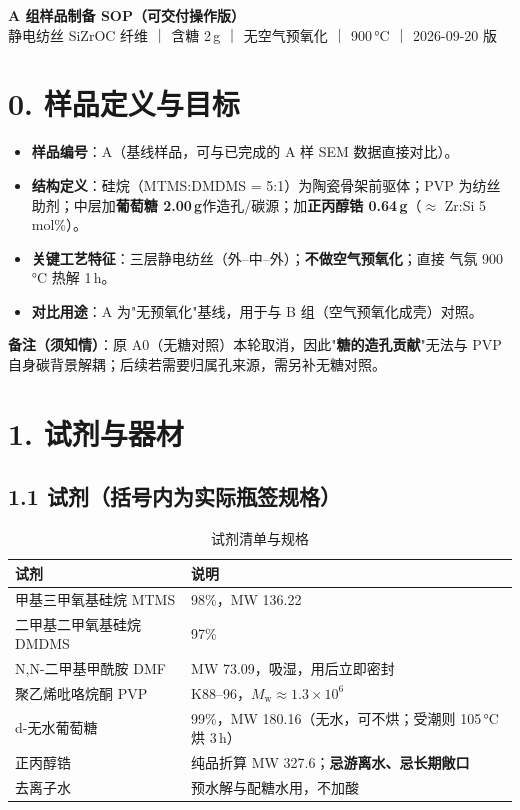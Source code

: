 \documentclass[a4paper, 11pt]{ctexart}
\begin{document}
\begin{center}
{\LARGE\bfseries A 组样品制备 SOP（可交付操作版）}\\[4pt]
{\normalsize 静电纺丝 SiZrOC 纤维 ｜ 含糖 2\,g ｜ 无空气预氧化 ｜  900\,°C ｜ 2026-09-20 版}
\end{center}

\section*{0. 样品定义与目标}
\begin{itemize}
  \item \textbf{样品编号}：A（基线样品，可与已完成的 A 样 SEM 数据直接对比）。
  \item \textbf{结构定义}：硅烷（MTMS:DMDMS = 5:1）为陶瓷骨架前驱体；PVP 为纺丝助剂；中层加\textbf{葡萄糖 2.00\,g}作造孔/碳源；加\textbf{正丙醇锆 0.64\,g}（$\approx$ Zr:Si 5\,mol\%）。
  \item \textbf{关键工艺特征}：三层静电纺丝（外--中--外）；\textbf{不做空气预氧化}；直接  气氛 900\,°C 热解 1\,h。
  \item \textbf{对比用途}：A 为"无预氧化"基线，用于与 B 组（空气预氧化成壳）对照。
\end{itemize}
\noindent\textbf{备注（须知情）}：原 A0（无糖对照）本轮取消，因此"\textbf{糖的造孔贡献}"无法与 PVP 自身碳背景解耦；后续若需要归属孔来源，需另补无糖对照。

\section*{1. 试剂与器材}
\subsection*{1.1 试剂（括号内为实际瓶签规格）}
\begin{table}[htbp]
\centering
\caption{试剂清单与规格}
\begin{tabularx}{\textwidth}{l X}
\toprule
试剂 & 说明 \\
\midrule
甲基三甲氧基硅烷 MTMS & 98\%，MW 136.22 \\
二甲基二甲氧基硅烷 DMDMS & 97\% \\
N,N-二甲基甲酰胺 DMF & MW 73.09，吸湿，用后立即密封 \\
聚乙烯吡咯烷酮 PVP & K88--96，$M_{\mathrm{w}}\approx1.3\times10^{6}$ \\
d-无水葡萄糖 & 99\%，MW 180.16（无水，可不烘；受潮则 105\,°C 烘 3\,h） \\
正丙醇锆 & 纯品折算 MW 327.6；\textbf{忌游离水、忌长期敞口} \\
去离子水 & 预水解与配糖水用，不加酸 \\
\bottomrule
\end{tabularx}
\end{table}
\end{document}
